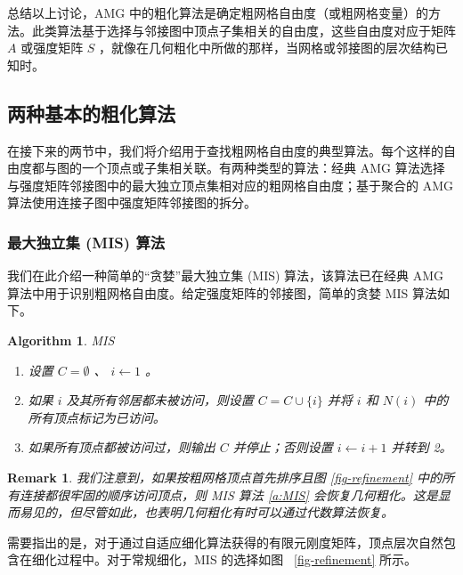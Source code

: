 \documentclass[12pt]{acta_2011xz}
\newtheorem{algorithm}[equation]{Algorithm}
\newtheorem{remark}[theorem]{Remark}
\begin{document}
 
 
 
 
 
   

总结以上讨论，AMG 中的粗化算法是确定粗网格自由度（或粗网格变量）的方法。此类算法基于选择与邻接图中顶点子集相关的自由度，这些自由度对应于矩阵    $A$    或强度矩阵    $S$   ，就像在几何粗化中所做的那样，当网格或邻接图的层次结构已知时。  

   \subsection{两种基本的粗化算法  }       \label{s:basic-coarsen}    在接下来的两节中，我们将介绍用于查找粗网格自由度的典型算法。每个这样的自由度都与图的一个顶点或子集相关联。有两种类型的算法：经典 AMG 算法选择与强度矩阵邻接图中的最大独立顶点集相对应的粗网格自由度；基于聚合的 AMG 算法使用连接子图中强度矩阵邻接图的拆分。  

   \subsubsection{最大独立集 (MIS) 算法  }       \label{s:MIS}    我们在此介绍一种简单的“贪婪”最大独立集 (MIS) 算法，该算法已在经典 AMG 算法中用于识别粗网格自由度。给定强度矩阵的邻接图，简单的贪婪 MIS 算法如下。  

   \begin{algorithm}   \caption{MIS    \label{a:MIS}     }    
   \begin{enumerate}[1.]

   \item   设置          $C=\emptyset$          、          $i\leftarrow 1$          。   \item   如果          $i$          及其所有邻居都未被访问，则设置          $C=C\cup \{ i \} $          并将          $i$          和          $N(i)$          中的所有顶点标记为已访问。   \item   如果所有顶点都被访问过，则输出          $C$          并停止；否则设置          $i\leftarrow i+1$          并转到 2。  \end{enumerate}     \end{algorithm}    
   \begin{remark}我们注意到，如果按粗网格顶点首先排序且图    \ref{fig-refinement}    中的所有连接都很牢固的顺序访问顶点，则 MIS 算法    \ref{a:MIS}    会恢复几何粗化。这是显而易见的，但尽管如此，也表明几何粗化有时可以通过代数算法恢复。  \end{remark}     

需要指出的是，对于通过自适应细化算法获得的有限元刚度矩阵，顶点层次自然包含在细化过程中。对于常规细化，MIS 的选择如图~    \ref{fig-refinement}    所示。  
\end{document}
